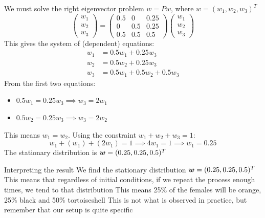 \documentclass[aspectratio=169]{beamer}\usepackage[]{graphicx}\usepackage[]{xcolor}
\begin{document}
\begin{frame}
We must solve the right eigenvector problem $w = Pw$, where $w = (w_1, w_2, w_3)^T$
\[
\begin{pmatrix} w_1 \\ w_2 \\ w_3 \end{pmatrix}
=
\begin{pmatrix}
0.5 & 0 & 0.25 \\
0 & 0.5 & 0.25 \\
0.5 & 0.5 & 0.5
\end{pmatrix}
\begin{pmatrix} w_1 \\ w_2 \\ w_3 \end{pmatrix}
\]
This gives the system of (dependent) equations:
\begin{align*}
w_1 &= 0.5 w_1 + 0.25 w_3 \\
w_2 &= 0.5 w_2 + 0.25 w_3 \\
w_3 &= 0.5 w_1 + 0.5 w_2 + 0.5 w_3
\end{align*}
From the first two equations:
\begin{itemize}
    \item $0.5 w_1 = 0.25 w_3 \implies w_3 = 2w_1$
    \item $0.5 w_2 = 0.25 w_3 \implies w_3 = 2w_2$
\end{itemize}
\vfill
This means $w_1 = w_2$. Using the constraint $w_1+w_2+w_3 = 1$:
\[
w_1 + (w_1) + (2w_1) = 1 \implies 4w_1 = 1 \implies w_1 = 0.25
\]
\vfill
The stationary distribution is $\bm{w} = (0.25, 0.25,0.5)^T$
\end{frame}

\begin{frame}{Interpreting the result}
We find the stationary distribution $\bm{w} = (0.25, 0.25,0.5)^T$
\vfill
This means that regardless of initial conditions, if we repeat the process enough times, we tend to that distribution
\vfill
This means 25\% of the females will be orange, 25\% black and 50\% tortoiseshell
\vfill
This is not what is observed in practice, but remember that our setup is quite specific
\end{frame}






\end{document}
